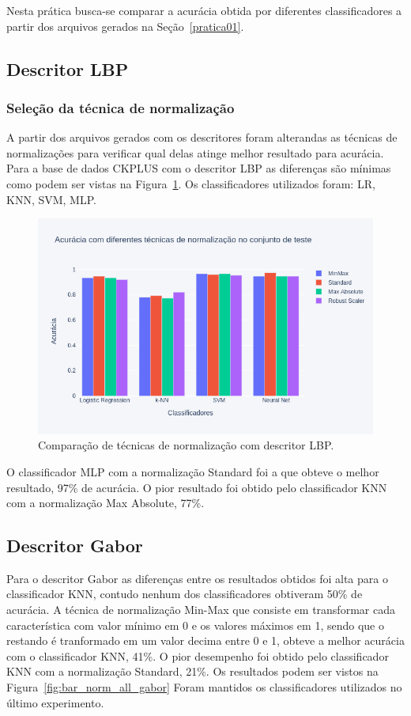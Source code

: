 Nesta prática busca-se comparar a acurácia obtida por diferentes classificadores a partir dos arquivos gerados na Seção~\ref{pratica01}.

\subsection{Descritor LBP}
\subsubsection{Seleção da técnica de normalização}
A partir dos arquivos gerados com os descritores foram alterandas as técnicas de normalizações para verificar qual delas atinge melhor resultado para acurácia. Para a base de dados CKPLUS com o descritor LBP as diferenças são mínimas como podem ser vistas na Figura~\ref{fig:bar_norm_all_lbp}. Os classificadores utilizados foram: LR, KNN, SVM, MLP.

\begin{figure}[!htbp]
	\centering
	\includegraphics[width=1.0\linewidth,clip=true,trim=0cm 0cm 0cm 0cm, keepaspectratio=true]{bar_norm_all_lbp.png}
	\caption{Comparação de técnicas de normalização com descritor LBP.}
	\label{fig:bar_norm_all_lbp}
\end{figure}

O classificador MLP com a normalização Standard foi a que obteve o melhor resultado, 97\% de acurácia. O pior resultado foi obtido pelo classificador KNN com a normalização Max Absolute, 77\%.

\subsection{Descritor Gabor}
Para o descritor Gabor as diferenças entre os resultados obtidos foi alta para o classificador KNN, contudo nenhum dos classificadores obtiveram 50\% de acurácia. A técnica de normalização Min-Max que consiste em transformar cada característica com valor mínimo em 0 e os valores máximos em 1, sendo que o restando é tranformado em um valor decima entre 0 e 1, obteve a melhor acurácia com o classificador KNN, 41\%. O pior desempenho foi obtido pelo classificador KNN com a normalização Standard, 21\%. Os resultados podem ser vistos na Figura~\ref{fig:bar_norm_all_gabor} Foram mantidos os classificadores utilizados no último experimento.

